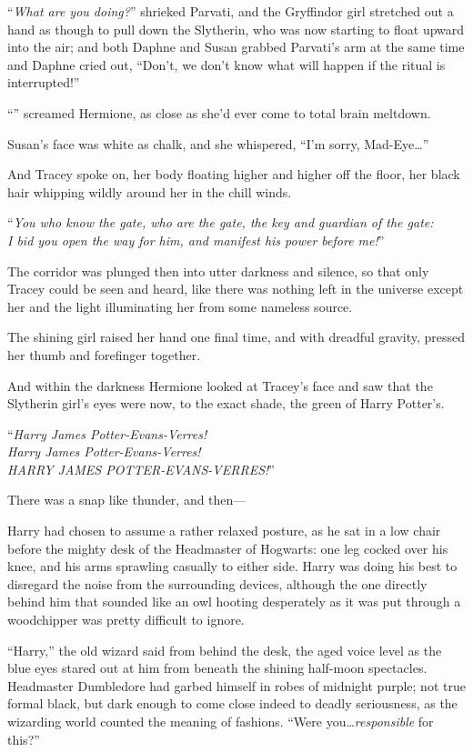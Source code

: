 “\emph{What are you doing?}” shrieked Parvati, and the Gryffindor girl stretched out a hand as though to pull down the Slytherin, who was now starting to float upward into the air; and both Daphne and Susan grabbed Parvati’s arm at the same time and Daphne cried out, “Don’t, we don’t know what will happen if the ritual is interrupted!”

“” screamed Hermione, as close as she’d ever come to total brain meltdown.

Susan’s face was white as chalk, and she whispered, “I’m sorry, Mad-Eye…”

And Tracey spoke on, her body floating higher and higher off the floor, her black hair whipping wildly around her in the chill winds.

“\emph{You who know the gate, who are the gate, the key and guardian of the gate:\\ I bid you open the way for him, and manifest his power before me!}”

The corridor was plunged then into utter darkness and silence, so that only Tracey could be seen and heard, like there was nothing left in the universe except her and the light illuminating her from some nameless source.

The shining girl raised her hand one final time, and with dreadful gravity, pressed her thumb and forefinger together.

And within the darkness Hermione looked at Tracey’s face and saw that the Slytherin girl’s eyes were now, to the exact shade, the green of Harry Potter’s.

“\emph{Harry James Potter-Evans-Verres!\\
Harry James Potter-Evans-Verres!\\
HARRY JAMES POTTER-EVANS-VERRES!}”

There was a snap like thunder, and then—

\later

Harry had chosen to assume a rather relaxed posture, as he sat in a low chair before the mighty desk of the Headmaster of Hogwarts: one leg cocked over his knee, and his arms sprawling casually to either side. Harry was doing his best to disregard the noise from the surrounding devices, although the one directly behind him that sounded like an owl hooting desperately as it was put through a woodchipper was pretty difficult to ignore.

“Harry,” the old wizard said from behind the desk, the aged voice level as the blue eyes stared out at him from beneath the shining half-moon spectacles. Headmaster Dumbledore had garbed himself in robes of midnight purple; not true formal black, but dark enough to come close indeed to deadly seriousness, as the wizarding world counted the meaning of fashions. “Were you…\emph{responsible} for this?”


